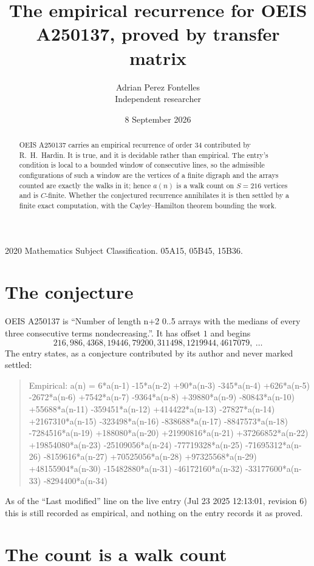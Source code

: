 \documentclass[11pt,a4paper]{article}
\title{The empirical recurrence for OEIS A250137, proved by transfer matrix}
\author{Adrian Perez Fontelles\\ \small Independent researcher}
\date{8 September 2026}
\theoremstyle{plain}
\theoremstyle{definition}
\begin{document}
\maketitle

\begin{abstract}
OEIS A250137 carries an empirical recurrence of order $34$ contributed by R.~H.~Hardin. It is
true, and it is decidable rather than empirical. The entry's condition is local to a bounded window of consecutive lines, so
the admissible configurations of such a window are the vertices of a finite digraph and the
arrays counted are exactly the walks in it; hence $a(n)$ is a walk count on $S=216$ vertices
and is $C$-finite. Whether the conjectured recurrence annihilates it is then settled by a
finite exact computation, with the Cayley--Hamilton theorem bounding the work.
\end{abstract}

\noindent\small 2020 Mathematics Subject Classification. 05A15, 05B45, 15B36.\normalsize

\section{The conjecture}

OEIS A250137 is ``Number of length n+2 0..5 arrays with the medians of every three consecutive terms nondecreasing.''. It has offset $1$ and begins
\[
216, 986, 4368, 19446, 79200, 311498, 1219944, 4617079,\ \dots
\]
The entry states, as a conjecture contributed by its author and never marked settled:
\begin{quote}
Empirical: a(n) = 6*a(n-1) -15*a(n-2) +90*a(n-3) -345*a(n-4) +626*a(n-5) -2672*a(n-6) +7542*a(n-7) -9364*a(n-8) +39880*a(n-9) -80843*a(n-10) +55688*a(n-11) -359451*a(n-12) +414422*a(n-13) -27827*a(n-14) +2167310*a(n-15) -323498*a(n-16) -838688*a(n-17) -8847573*a(n-18) -7284516*a(n-19) +188080*a(n-20) +21990816*a(n-21) +37266852*a(n-22) +19854080*a(n-23) -25109056*a(n-24) -77719328*a(n-25) -71695312*a(n-26) -8159616*a(n-27) +70525056*a(n-28) +97325568*a(n-29) +48155904*a(n-30) -15482880*a(n-31) -46172160*a(n-32) -33177600*a(n-33) -8294400*a(n-34)
\end{quote}
As of the ``Last modified'' line on the live entry (Jul 23 2025 12:13:01, revision 6) this is still
recorded as empirical, and nothing on the entry records it as proved.

\section{The count is a walk count}
\end{document}
